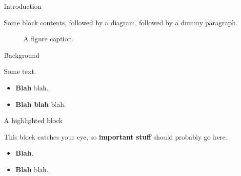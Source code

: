 \documentclass[final]{beamer}
\newlength{\sepwidth}
\newlength{\colwidth}
\newcommand{\separatorcolumn}{\begin{column}{\sepwidth}\end{column}}
\begin{document}
\begin{frame}[t]
    \begin{columns}[t]
        \separatorcolumn


        \begin{column}{\colwidth}

            \begin{block}{Introduction}

                Some block contents, followed by a diagram, followed by a dummy paragraph.

                \begin{figure}
                    \centering
                    \caption{A figure caption.}
                \end{figure}

                \lipsum[1]

            \end{block}

            \begin{block}{Background}

                Some text.

                \begin{itemize}
                    \item \textbf{Blah} blah.
                    \item \textbf{Blah blah} blah.
                \end{itemize}

            \end{block}

            \begin{alertblock}{A highlighted block}

                This block catches your eye, so \textbf{important stuff} should probably go
                here.

                \begin{itemize}
                    \item \textbf{Blah}.
                    \item \textbf{Blah} blah.
                \end{itemize}


\end{alertblock}
\end{column}
\end{columns}
\end{frame}
\end{document}
